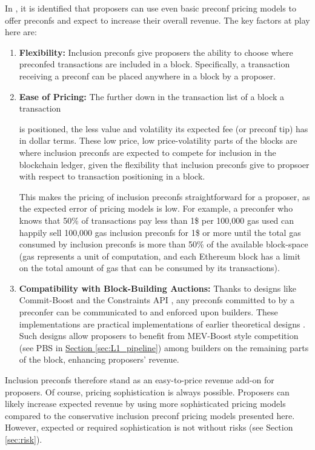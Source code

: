 \documentclass[a4paper]{article}
\theoremstyle{boldstyle}
\newcommand{\todocm}[1]{\todo[color=blue!40]{\textbf{Conor:} #1}}
\begin{document}
    
    In \cite{W:APricingModelforInclusionPreconfirmations, W:PricingTransactionsforPreconfirmation}, it is identified that proposers can use even basic preconf pricing models to offer preconfs and expect to increase their overall revenue. The key factors at play here are:
    \begin{enumerate}
        \item \textbf{Flexibility:} Inclusion preconfs give proposers the ability to choose where preconfed transactions are included in a block. Specifically, a transaction receiving a preconf can be placed anywhere in a block by a proposer.
        \item \textbf{Ease of Pricing:} The further down in the transaction list of a block a transaction 

        is positioned, the less value and volatility its expected fee (or preconf tip)
        has in dollar terms. These low price, low price-volatility parts of the blocks are where inclusion preconfs are expected to compete for inclusion in the blockchain ledger, given the flexibility that inclusion preconfs give to propsoer with respect to transaction positioning in a block. 

        This makes the pricing of inclusion preconfs straightforward for a proposer, as the expected error of pricing models is low. For example, a preconfer who knows that 50\% of transactions pay less than 1\$ per 100,000 gas used can happily sell 100,000 gas inclusion preconfs for 1\$ or more until the total gas consumed by inclusion preconfs is more than 50\% of the available block-space (gas represents a unit of computation, and each Ethereum block has a limit on the total amount of gas that can be consumed by its transactions). 
        \item \textbf{Compatibility with Block-Building Auctions:} Thanks to designs like Commit-Boost \cite{CommitBoostRepo} and the Constraints API \cite{W:ConstraintsAPISpecification}, any preconfs committed to by a preconfer can be communicated to and enforced upon builders. These implementations are practical implementations of earlier theoretical designs \cite{ResistanceisnotfutileCRinMEVBOOST}. Such designs allow proposers to benefit from MEV-Boost style competition (see PBS in \hyperref[sec:background]{Section \ref{sec:L1_pipeline}}) among builders on the remaining parts of the block, enhancing proposers' revenue. 
    \end{enumerate}
    Inclusion preconfs therefore stand as an easy-to-price revenue add-on for proposers. Of course, pricing sophistication is always possible. Proposers can likely increase expected revenue by using 
    more sophisticated pricing models compared to the conservative inclusion preconf pricing models presented here. However, expected or required sophistication is not without risks (see Section \ref{sec:risk}). 
\end{document}
